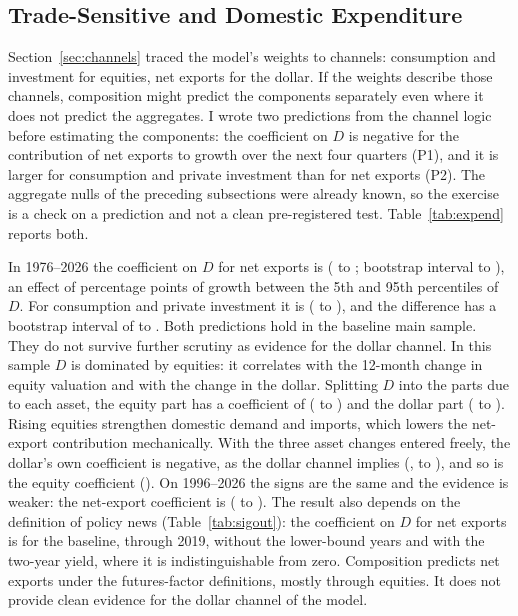 \documentclass[11pt]{article}
\begin{document}
\begin{appendices}
\subsection{Trade-Sensitive and Domestic Expenditure}\label{sec:expend}
Section~\ref{sec:channels} traced the model's weights to channels: consumption and investment for equities, net exports for the dollar. If the weights describe those channels, composition might predict the components separately even where it does not predict the aggregates. I wrote two predictions from the channel logic before estimating the components: the coefficient on $D$ is negative for the contribution of net exports to growth over the next four quarters (P1), and it is larger for consumption and private investment than for net exports (P2). The aggregate nulls of the preceding subsections were already known, so the exercise is a check on a prediction and not a clean pre-registered test. Table~\ref{tab:expend} reports both.



In 1976--2026 the coefficient on $D$ for net exports is  ( to ; bootstrap interval  to ), an effect of  percentage points of growth between the 5th and 95th percentiles of $D$. For consumption and private investment it is  ( to ), and the difference has a bootstrap interval of  to . Both predictions hold in the baseline main sample. They do not survive further scrutiny as evidence for the dollar channel. In this sample $D$ is dominated by equities: it correlates  with the 12-month change in equity valuation and  with the change in the dollar. Splitting $D$ into the parts due to each asset, the equity part has a coefficient of  ( to ) and the dollar part  ( to ). Rising equities strengthen domestic demand and imports, which lowers the net-export contribution mechanically. With the three asset changes entered freely, the dollar's own coefficient is negative, as the dollar channel implies (,  to ), and so is the equity coefficient (). On 1996--2026 the signs are the same and the evidence is weaker: the net-export coefficient is  ( to ). The result also depends on the definition of policy news (Table~\ref{tab:sigout}): the coefficient on $D$ for net exports is  for the baseline,  through 2019,  without the lower-bound years and  with the two-year yield, where it is indistinguishable from zero. Composition predicts net exports under the futures-factor definitions, mostly through equities. It does not provide clean evidence for the dollar channel of the model.


\end{appendices}
\end{document}

